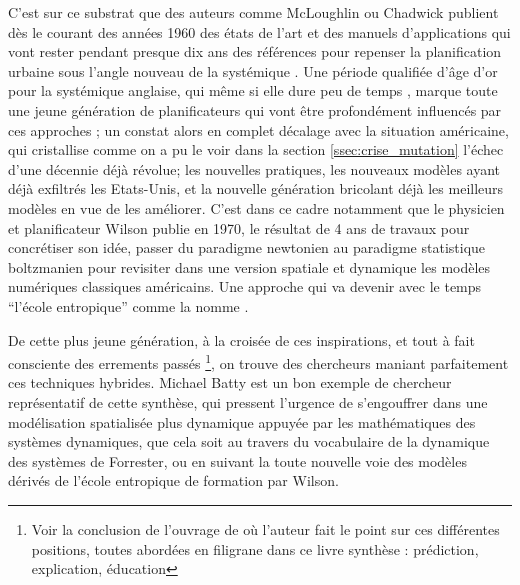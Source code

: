 C'est sur ce substrat \autocite[253]{Batty1978} que des auteurs comme McLoughlin ou Chadwick publient dès le courant des années 1960 des états de l'art et des manuels d'applications qui vont rester pendant presque dix ans des références pour repenser la planification urbaine sous l'angle nouveau de la systémique \autocite[719]{Davies1997}. Une période qualifiée d'âge d'or pour la systémique anglaise, qui même si elle dure peu de temps \autocites[726-727]{Davies1997}{McLoughin1985}, marque toute une jeune génération de planificateurs qui vont être profondément influencés par ces approches \autocites[5-6]{Batty1976}[256]{Batty1978}; un constat alors en complet décalage avec la situation américaine, qui cristallise comme on a pu le voir dans la section \ref{ssec:crise_mutation} l'échec d'une décennie déjà révolue; les nouvelles pratiques, les nouveaux modèles ayant déjà exfiltrés les Etats-Unis, et la nouvelle génération bricolant déjà les meilleurs modèles en vue de les améliorer. C'est dans ce cadre notamment que le physicien et planificateur Wilson publie en 1970, le résultat de 4 ans de travaux pour concrétiser son idée, passer du paradigme newtonien au paradigme statistique boltzmanien pour revisiter dans une version spatiale et dynamique les modèles numériques classiques américains. \autocite{Wilson2010} Une approche qui va devenir avec le temps \enquote{l'école entropique} comme la nomme \textcite{Guermond1984}.

De cette plus jeune génération, à la croisée de ces inspirations, et tout à fait consciente des errements passés \footnote{Voir la conclusion de l'ouvrage de \textcite[357]{Batty1976} où l'auteur fait le point sur ces différentes positions, toutes abordées en filigrane dans ce livre synthèse : prédiction, explication, éducation }, on trouve des chercheurs maniant parfaitement ces techniques hybrides. Michael Batty est un bon exemple de chercheur représentatif de cette synthèse, qui pressent l'urgence de s'engouffrer dans une modélisation spatialisée plus dynamique \autocite{Batty1971,Batty1972} appuyée par les mathématiques des systèmes dynamiques, que cela soit au travers du vocabulaire de la dynamique des systèmes de Forrester, ou en suivant la toute nouvelle voie des modèles dérivés de l'école entropique de formation par Wilson.


